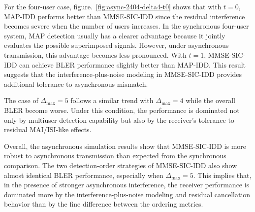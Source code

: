 For the four-user case, figure.~\ref{fig:async-2404-delta4-t0} shows that with $t=0$, MAP-IDD performs better than MMSE-SIC-IDD since the residual interference becomes severe when the number of users increases. In the synchronous four-user system, MAP detection usually has a clearer advantage because it jointly evaluates the possible superimposed signals. However, under asynchronous transmission, this advantage becomes less pronounced. With $t=1$, MMSE-SIC-IDD can achieve BLER performance slightly better than MAP-IDD. This result suggests that the interference-plus-noise modeling in MMSE-SIC-IDD provides additional tolerance to asynchronous mismatch.

The case of $\Delta_{\max}=5$ follows a similar trend with $\Delta_{\max}=4$ while the overall BLER become worse. Under this condition, the performance is dominated not only by multiuser detection capability but also by the receiver's tolerance to residual MAI/ISI-like effects.

Overall, the asynchronous simulation results show that MMSE-SIC-IDD is more robust to asynchronous transmission than expected from the synchronous comparison. The two detection-order strategies of MMSE-SIC-IDD also show almost identical BLER performance, especially when $\Delta_{\max}=5$. This implies that, in the presence of stronger asynchronous interference, the receiver performance is dominated more by the interference-plus-noise modeling and residual cancellation behavior than by the fine difference between the ordering metrics.
